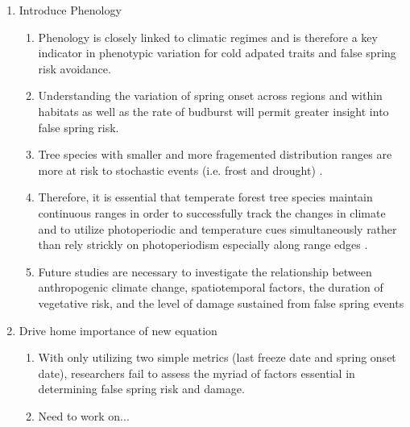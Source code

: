 \documentclass{article}\usepackage[]{graphicx}\usepackage[]{color}
\begin{document}
\begin{enumerate}
\item Introduce Phenology
\begin{enumerate}
\item Phenology is closely linked to climatic regimes \citep{Wolkovich2011} and is therefore a key indicator in phenotypic variation for cold adpated traits and false spring risk avoidance.
\item Understanding the variation of spring onset across regions and within habitats as well as the rate of budburst will permit greater insight into false spring risk.
\item Tree species with smaller and more fragemented distribution ranges are more at risk to stochastic events (i.e. frost and drought) \citep{Alberto2013}. 
\item Therefore, it is essential that temperate forest tree species maintain continuous ranges in order to successfully track the changes in climate and to utilize photoperiodic and temperature cues simultaneously rather than rely strickly on photoperiodism especially along range edges \citep{Zohner2016, Gauzere2017}.
\item Future studies are necessary to investigate the relationship between anthropogenic climate change, spatiotemporal factors, the duration of vegetative risk, and the level of damage sustained from false spring events
\end{enumerate}

\item Drive home importance of new equation
\begin{enumerate}
\item With only utilizing two simple metrics (last freeze date and spring onset date), researchers fail to assess the myriad of factors essential in determining false spring risk and damage. 
\item Need to work on...
\end{enumerate}
\end{enumerate}




\end{document}
